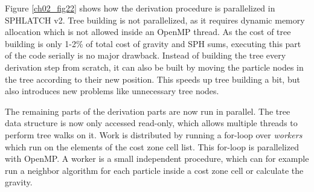 Figure \ref{ch02_fig22} shows how the derivation procedure is parallelized in SPHLATCH v2. Tree building is not parallelized, as it requires dynamic memory allocation which is not allowed inside an OpenMP thread. As the cost of tree building is only 1-2\% of total cost of gravity and SPH sums, executing this part of the code serially is no major drawback. Instead of building the tree every derivation step from scratch, it can also be built by moving the particle nodes in the tree according to their new position. This speeds up tree building a bit, but also introduces new problems like unnecessary tree nodes. 

The remaining parts of the derivation parts are now run in parallel. The tree data structure is now only accessed read-only, which allows multiple threads to perform tree walks on it. Work is distributed by running a for-loop over \emph{workers} which run on the elements of the cost zone cell list. This for-loop is parallelized with OpenMP. A worker is a small independent procedure, which can for example run a neighbor algorithm for each particle inside a cost zone cell or calculate the gravity.


